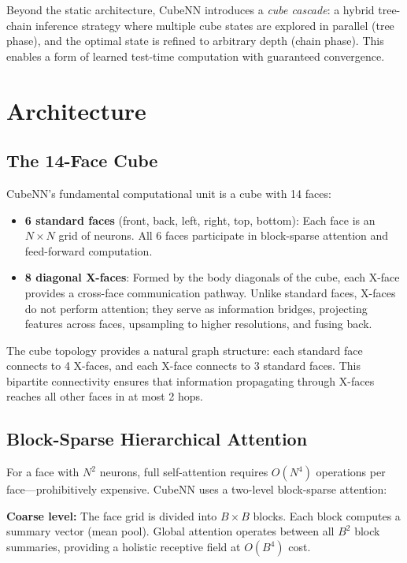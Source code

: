 \documentclass{article}
\begin{document}
Beyond the static architecture, CubeNN introduces a \textit{cube cascade}: a hybrid tree-chain inference strategy where multiple cube states are explored in parallel (tree phase), and the optimal state is refined to arbitrary depth (chain phase). This enables a form of learned test-time computation with guaranteed convergence.

\section{Architecture}

\subsection{The 14-Face Cube}

CubeNN's fundamental computational unit is a cube with 14 faces:

\begin{itemize}
    \item \textbf{6 standard faces} (front, back, left, right, top, bottom): Each face is an $N \times N$ grid of neurons. All 6 faces participate in block-sparse attention and feed-forward computation.
    \item \textbf{8 diagonal X-faces}: Formed by the body diagonals of the cube, each X-face provides a cross-face communication pathway. Unlike standard faces, X-faces do not perform attention; they serve as information bridges, projecting features across faces, upsampling to higher resolutions, and fusing back.
\end{itemize}

The cube topology provides a natural graph structure: each standard face connects to 4 X-faces, and each X-face connects to 3 standard faces. This bipartite connectivity ensures that information propagating through X-faces reaches all other faces in at most 2 hops.

\subsection{Block-Sparse Hierarchical Attention}

For a face with $N^2$ neurons, full self-attention requires $O(N^4)$ operations per face—prohibitively expensive. CubeNN uses a two-level block-sparse attention:

\textbf{Coarse level:} The face grid is divided into $B \times B$ blocks. Each block computes a summary vector (mean pool). Global attention operates between all $B^2$ block summaries, providing a holistic receptive field at $O(B^4)$ cost.
\end{document}
